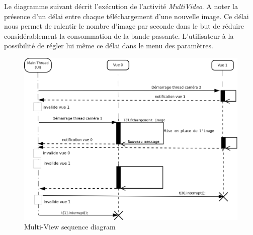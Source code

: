 Le diagramme suivant décrit l'exécution de l'activité \textit{MultiVideo}. A
noter la présence d'un délai entre chaque téléchargement d'une nouvelle image.
Ce délai nous permet de ralentir le nombre d'image par seconde dans le but de réduire considérablement la consommation de la bande passante.
L'utilisateur à la possibilité de régler lui même ce délai dans le menu des
paramètres.
 \begin{figure}[H]
  \label{DiagrammeSequenceMultiView}
  \centering
   \includegraphics[scale=0.22]{Images/DiagrammeSequenceMultiView.png}
  \caption{Multi-View sequence diagram}
\end{figure}  


